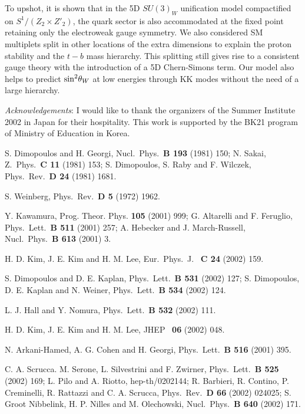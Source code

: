 \documentclass[a4paper,11pt]{article}
\begin{document}
To upshot, it is shown that in the 5D $SU(3)_W$ unification model compactified
on $S^1/(Z_2\times Z'_2)$, the quark
sector is also accommodated at the fixed point retaining only the electroweak
gauge symmetry. We also considered SM multiplets split in other locations 
of the extra dimensions to explain the proton stability and the $t-b$ mass 
hierarchy. This splitting still gives rise to a consistent gauge theory with
the introduction of a 5D Chern-Simons term. Our model also helps to
predict ${\rm sin}^2\theta_W$ at low energies through KK modes without the need
of a large hierarchy.   

\vskip 0.5cm
\noindent
{\it Acknowledgements}: I would like to thank the organizers of the Summer 
Institute 2002 in Japan for their hospitality. This work is supported 
by the BK21 program of Ministry of Education in Korea.

\begin{thebibliography}{99}

\def\apj#1#2#3{Astrophys.\ J.\ {\bf #1} (#2) #3}
\def\ijmp#1#2#3{Int.\ J.\ Mod.\ Phys.\ {\bf #1} (#2) #3}
\def\mpl#1#2#3{Mod.\ Phys.\ Lett.\ {\bf #1} (#2) #3}
\def\nat#1#2#3{Nature\ {\bf #1} (#2) #3}
\def\npb#1#2#3{Nucl.\ Phys.\ {\bf B #1} (#2) #3}
\def\plb#1#2#3{Phys.\ Lett.\ {\bf B #1} (#2) #3}
\def\prd#1#2#3{Phys.\ Rev.\ {\bf D #1} (#2) #3}
\def\prl#1#2#3{Phys.\ Rev.\ Lett.\ {\bf #1} (#2) #3}
\def\prt#1#2#3{Phys.\ Rep.\ {\bf #1} (#2) #3}
\def\sjnp#1#2#3{Sov.\ J.\ Nucl.\ Phys.\ {\bf #1} (#2) #3}
\def\zp#1#2#3{Z.\ Phys.\ {\bf C #1} (#2) #3}
\def\jhep#1#2#3{JHEP \ {\bf #1} (#2) #3}
\def\epjc#1#2#3{Eur.\ Phys.\ J. \ {\bf C #1} (#2) #3}

 S. Dimopoulos and H. Georgi, \npb{193}{1981}{150};
N. Sakai, \zp{11}{1981}{153}; S. Dimopoulos, S. Raby and F. Wilczek, 
\prd{24}{1981}{1681}.

 S. Weinberg, \prd{5}{1972}{1962}.

 Y. Kawamura, Prog. Theor. Phys. {\bf 105} (2001) 999;
G. Altarelli and F. Feruglio, \plb{511}{2001}{257}; A. Hebecker and 
J. March-Russell, \npb{613}{2001}{3}.

 H. D. Kim, J. E. Kim and H. M. Lee, \epjc{24}{2002}{159}. 

 S. Dimopoulos and D. E. Kaplan, \plb{531}{2002}{127};
S. Dimopoulos, D. E. Kaplan and N. Weiner, \plb{534}{2002}{124}.

 L. J. Hall and Y. Nomura, \plb{532}{2002}{111}.

 H. D. Kim, J. E. Kim and H. M. Lee, \jhep{06}{2002}{048}.

 N. Arkani-Hamed, A. G. Cohen and H. Georgi, 
\plb{516}{2001}{395}.

 C. A. Scrucca. M. Serone, L. Silvestrini and F. Zwirner, 
\plb{525}{2002}{169}; L. Pilo and A. Riotto, hep-th/0202144; R. Barbieri,
R. Contino, P. Creminelli, R. Rattazzi and C. A. Scrucca, 
\prd{66}{2002}{024025}; S. Groot Nibbelink, H. P. Nilles and M. Olechowski,
\npb{640}{2002}{171}.

\end{thebibliography}
\end{document}
